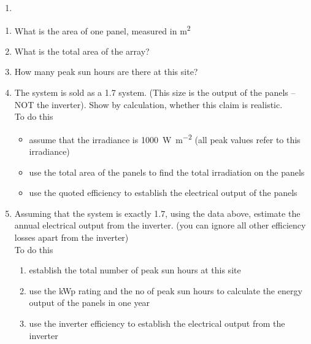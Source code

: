\documentclass[crop=false,parskip=half]{scrartcl} %
\begin{document}
\begin{solution}\label{sol:el1}
\begin{enumerate}
\item 
\end{enumerate}
\end{solution}

\begin{question}\label{qu:ex1}
\begin{enumerate} [label=\alph*)]
\item What is the area of one panel, measured in \si{\metre\squared}
\item What is the total area of the array?
\item How many peak sun hours are there at this site?
\item The system is sold as a \SI{1.7}{\kilowattpeak} system. (This size is the output of the panels – NOT the inverter). Show by calculation, whether this claim is realistic.\\ 
To do this
\begin{itemize}
\item assume that the irradiance is \SI{1000}{\watt\per\metre\squared}  (all peak values refer to this irradiance)
\item use the total area of the panels to find the total irradiation on the panels
\item use the quoted efficiency to establish the electrical output of the panels
\end{itemize}

\item Assuming that the system is exactly \SI{1.7}{\kilowattpeak}, using the data above, estimate the annual electrical output from the inverter.  (you can ignore all other efficiency losses apart from the inverter)\\
To do this
\begin{enumerate} [label=\roman*)]
\item establish the total number of peak sun hours at this site
\item use the kWp rating and the no of peak sun hours to calculate the energy output of the panels in one year
\item use the inverter efficiency to establish the electrical output from the inverter
\end{enumerate}


\end{enumerate}
\end{question}
\end{document}
